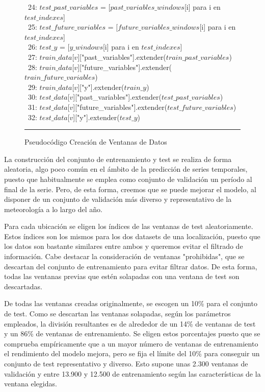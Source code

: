 \begin{figure}[H]
{\begin{center}
\begin{tabbing}
\ 24: \> \> \> $test\_past\_variables$ = [$past\_variables\_windows$[i] para i en $test\_indexes$] \\
\ 25: \> \> \> $test\_future\_variables$ = [$future\_variables\_windows$[i] para i en $test\_indexes$] \\
\ 26: \> \> \> $test\_y$ = [$y\_windows$[i] para i en $test\_indexes$] \\
      
\ 27: \> \> \> $train\_data$[$v$]["past\_variables"].extender($train\_past\_variables$) \\
\ 28: \> \> \> $train\_data$[$v$]["future\_variables"].extender($train\_future\_variables$) \\
\ 29: \> \> \> $train\_data$[$v$][\string"y"].extender($train\_y$) \\
        
\ 30: \> \> \> $test\_data$[$v$]["past\_variables"].extender($test\_past\_variables$) \\
\ 31: \> \> \> $test\_data$[$v$]["future\_variables"].extender($test\_future\_variables$) \\
\ 32: \> \> \> $test\_data$[$v$][\string"y"].extender($test\_y$) \\

\end{tabbing}
\end{center}
\hrule
}
\caption{Pseudocódigo Creación de Ventanas de Datos}
\label{code_data_windows}
\end{figure}

La construcción del conjunto de entrenamiento y test se realiza de forma aleatoria, algo poco común en el ámbito de la predicción de series temporales, puesto que habitualmente 
se emplea como conjunto de validación un período al final de la serie. Pero, de esta forma, creemos que se puede mejorar el modelo, al disponer de un conjunto de validación
más diverso y representativo de la meteorología a lo largo del año.

Para cada ubicación se eligen los índices de las ventanas de test aleatoriamente. Estos índices son los mismos para los dos datasets de una localización, 
puesto que los datos son bastante similares entre ambos y queremos evitar el filtrado de información. 
Cabe destacar la consideración de ventanas "prohibidas", que se descartan del conjunto de entrenamiento para evitar filtrar datos.
De esta forma, todas las ventanas previas que estén solapadas con una ventana de test son descartadas.

De todas las ventanas creadas originalmente, se escogen un 10\% para el conjunto de test. Como se descartan las ventanas solapadas, según los parámetros empleados, la división resultantes
es de alrededor de un 14\% de ventanas de test y un 86\% de ventanas de entrenamiento. Se eligen estos porcentajes puesto que se comprueba empíricamente que a un mayor número de 
ventanas de entrenamiento el rendimiento del modelo mejora, pero se fija el límite del 10\% para conseguir un conjunto de test representativo y diverso. Esto supone unas 2.300 ventanas
de validación y entre 13.900 y 12.500 de entrenamiento según las características de la ventana elegidas. 

